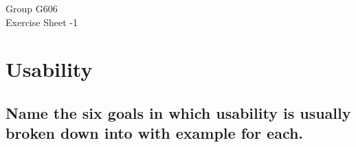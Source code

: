 \documentclass[10pt]{scrartcl}
\begin{document}
\setlength{\textheight}{21cm}
\setlength{\parindent}{0cm}
\setlength{\headheight}{1.75cm}
\setlength{\headsep}{1cm}
\setlength{\footskip}{1.5cm}

\renewcommand{\headrulewidth}{0pt} 
\renewcommand{\footrulewidth}{0pt} 

\pagestyle{fancy}
\lfoot{}
\cfoot{\thepage\ -- \pageref{LastPage}}

\begin{flushright}
{Group G606\\ Exercise Sheet -1}
\end{flushright}
\section{Usability} 
\subsection{Name the six goals in which usability is usually broken down into with example for each.}
	
\end{document}
